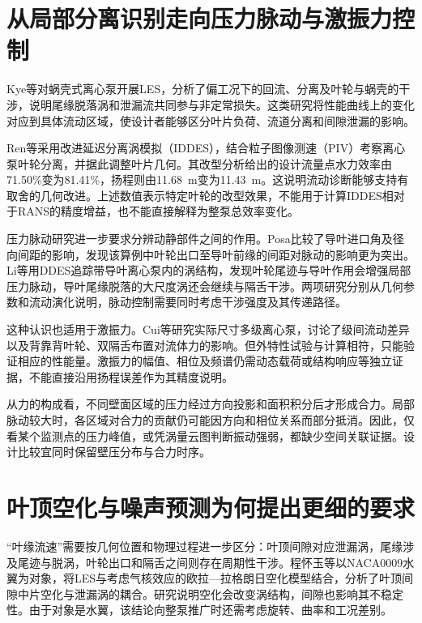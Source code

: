 \section{从局部分离识别走向压力脉动与激振力控制}

Kye等对蜗壳式离心泵开展LES，分析了偏工况下的回流、分离及叶轮与蜗壳的干涉，说明尾缘脱落涡和泄漏流共同参与非定常损失\cite{Kye2018VoluteLES}。这类研究将性能曲线上的变化对应到具体流动区域，使设计者能够区分叶片负荷、流道分离和间隙泄漏的影响。

Ren等采用改进延迟分离涡模拟（IDDES），结合粒子图像测速（PIV）考察离心泵叶轮分离，并据此调整叶片几何\cite{Ren2019SeparationIDDES}。其改型分析给出的设计流量点水力效率由71.50\%变为81.41\%，扬程则由11.68~m变为11.43~m。这说明流动诊断能够支持有取舍的几何改进。上述数值表示特定叶轮的改型效果，不能用于计算IDDES相对于RANS的精度增益，也不能直接解释为整泵总效率变化。

压力脉动研究进一步要求分辨动静部件之间的作用。Posa比较了导叶进口角及径向间距的影响，发现该算例中叶轮出口至导叶前缘的间距对脉动的影响更为突出\cite{Posa2021DiffuserAngle}。Li等用DDES追踪带导叶离心泵内的涡结构，发现叶轮尾迹与导叶作用会增强局部压力脉动，导叶尾缘脱落的大尺度涡还会继续与隔舌干涉\cite{Li2022VorticalDDES}。两项研究分别从几何参数和流动演化说明，脉动控制需要同时考虑干涉强度及其传递路径。

这种认识也适用于激振力。Cui等研究实际尺寸多级离心泵，讨论了级间流动差异以及背靠背叶轮、双隔舌布置对流体力的影响\cite{Cui2022ExcitingForces}。但外特性试验与计算相符，只能验证相应的性能量。激振力的幅值、相位及频谱仍需动态载荷或结构响应等独立证据，不能直接沿用扬程误差作为其精度说明。

从力的构成看，不同壁面区域的压力经过方向投影和面积积分后才形成合力。局部脉动较大时，各区域对合力的贡献仍可能因方向和相位关系而部分抵消。因此，仅看某个监测点的压力峰值，或凭涡量云图判断振动强弱，都缺少空间关联证据。设计比较宜同时保留壁压分布与合力时序。

\section{叶顶空化与噪声预测为何提出更细的要求}

“叶缘流速”需要按几何位置和物理过程进一步区分：叶顶间隙对应泄漏涡，尾缘涉及尾迹与脱涡，叶轮出口和隔舌之间则存在周期性干涉。程怀玉等以NACA0009水翼为对象，将LES与考虑气核效应的欧拉—拉格朗日空化模型结合，分析了叶顶间隙中片空化与泄漏涡的耦合\cite{Cheng2021TLVCavitation}。研究说明空化会改变涡结构，间隙也影响其不稳定性。由于对象是水翼，该结论向整泵推广时还需考虑旋转、曲率和工况差别。

